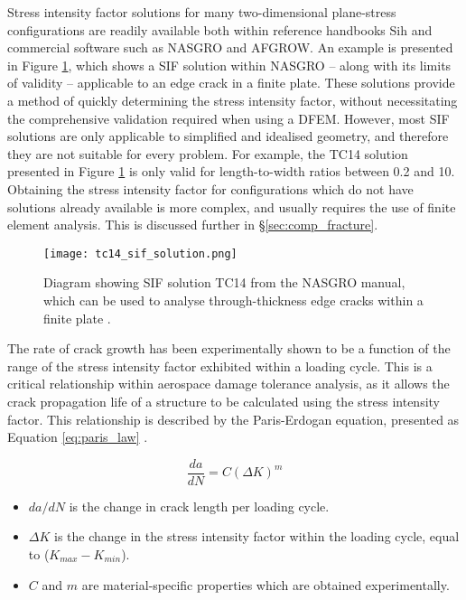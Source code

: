 Stress intensity factor solutions for many two-dimensional plane-stress configurations are readily available both within reference handbooks Sih \cite{sih_handbook_1973} and commercial software such as NASGRO and AFGROW. An example is presented in Figure \ref{fig:sif_solution}, which shows a SIF solution within NASGRO -- along with its limits of validity -- applicable to an edge crack in a finite plate. These solutions provide a method of quickly determining the stress intensity factor, without necessitating the comprehensive validation required when using a DFEM. However, most SIF solutions are only applicable to simplified and idealised geometry, and therefore they are not suitable for every problem. For example, the TC14 solution presented in Figure \ref{fig:sif_solution} is only valid for length-to-width ratios between 0.2 and 10. Obtaining the stress intensity factor for configurations which do not have solutions already available is more complex, and usually requires the use of finite element analysis. This is discussed further in \S\ref{sec:comp_fracture}.

\begin{figure}[H]
	\centering
	\texttt{[image: tc14\_sif\_solution.png]}
	\caption{Diagram showing SIF solution TC14 from the NASGRO manual, which can be used to analyse through-thickness edge cracks within a finite plate \cite{nasgro_fatigue_2022}.}
	\label{fig:sif_solution}
\end{figure}

The rate of crack growth has been experimentally shown to be a function of the range of the stress intensity factor exhibited within a loading cycle. This is a critical relationship within aerospace damage tolerance analysis, as it allows the crack propagation life of a structure to be calculated using the stress intensity factor. This relationship is described by the Paris-Erdogan equation, presented as Equation \ref{eq:paris_law} \cite{anderson_fracture_2017}.

\begin{equation}
	\frac{da}{dN} = C(\Delta K)^m\label{eq:paris_law}
\end{equation}

\begin{itemize}
	\item ${da}/{dN}$ is the change in crack length per loading cycle.
	\item $\Delta K$ is the change in the stress intensity factor within the loading cycle, equal to ($K_{max} - K_{min}$).
	\item  $C$ and $m$ are material-specific properties which are obtained experimentally.
\end{itemize}


